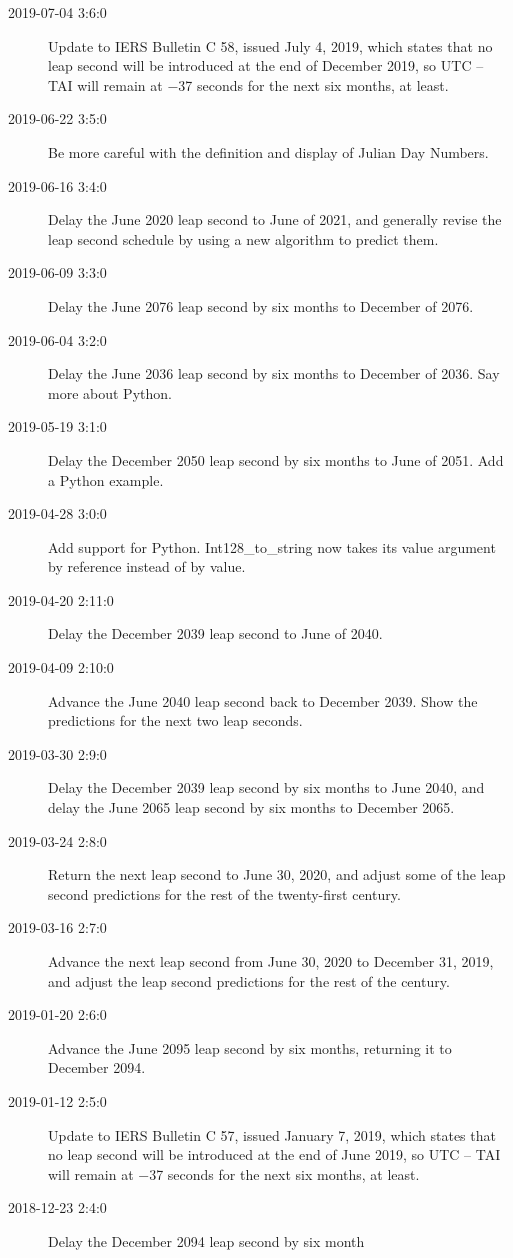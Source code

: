 \documentclass[letterpaper,twoside]{article}
\begin{document}
\begin{description}
\item[2019-07-04 3:6:0]Update to IERS Bulletin C 58, issued July
  4, 2019, which states that no leap second will be introduced
  at the end of December 2019, so UTC -- TAI will remain at
  \num{-37} seconds for the next six months, at least.  
\item[2019-06-22 3:5:0] Be more careful with the definition
  and display of Julian Day Numbers.
\item[2019-06-16 3:4:0] Delay the June 2020 leap second to
  June of 2021, and generally revise the leap second schedule
  by using a new algorithm to predict them.
\item[2019-06-09 3:3:0] Delay the June 2076 leap second by
  six months to December of 2076.
\item[2019-06-04 3:2:0] Delay the June 2036 leap second by
  six months to December of 2036.  Say more about Python.
\item[2019-05-19 3:1:0] Delay the December 2050 leap second
  by six months to June of 2051.  Add a Python example.
\item[2019-04-28 3:0:0] Add support for Python.  Int128\_to\_string
  now takes its value argument by reference instead of by value.
\item[2019-04-20 2:11:0] Delay the December 2039 leap second
  to June of 2040.
\item[2019-04-09 2:10:0] Advance the June 2040 leap second back to
  December 2039.  Show the predictions for the next two leap seconds.
\item[2019-03-30 2:9:0] Delay the December 2039 leap second by six
  months to June 2040, and delay the June 2065 leap second by six
  months to December 2065.
\item[2019-03-24 2:8:0] Return the next leap second to June 30, 2020,
  and adjust some of the leap second predictions for the rest of the
  twenty-first century.
\item[2019-03-16 2:7:0] Advance the next leap second from June 30, 2020
  to December 31, 2019, and adjust the leap second predictions
  for the rest of the century.
\item[2019-01-20 2:6:0] Advance the June 2095 leap second by six
  months, returning it to December 2094.
\item[2019-01-12 2:5:0] Update to IERS Bulletin C 57, issued January
  7, 2019, which states that no leap second will be introduced
  at the end of June 2019, so UTC -- TAI will remain at
  \num{-37} seconds for the next six months, at least.  
\item[2018-12-23 2:4:0] Delay the December 2094 leap second by six month

\end{description}
\end{document}
